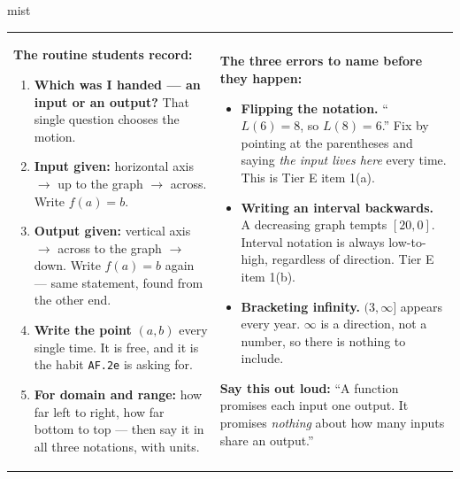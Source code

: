 \documentclass[10pt]{article}
\begin{document}
\boxguard
\begin{skillbox}{mist}
\begin{tabularx}{\linewidth}{@{}X|X@{}}
\begin{minipage}[t]{\linewidth}\vspace{0pt}
\textbf{The routine students record:}
\begin{enumerate}[leftmargin=1.4em, itemsep=2pt, topsep=2pt]
  \item \textbf{Which was I handed --- an input or an output?} That single question chooses the
        motion.
  \item \textbf{Input given:} horizontal axis $\to$ up to the graph $\to$ across. Write $f(a)=b$.
  \item \textbf{Output given:} vertical axis $\to$ across to the graph $\to$ down. Write $f(a)=b$
        again --- same statement, found from the other end.
  \item \textbf{Write the point} $(a,b)$ every single time. It is free, and it is the habit
        \texttt{AF.2e} is asking for.
  \item \textbf{For domain and range:} how far left to right, how far bottom to top --- then say
        it in all three notations, with units.
\end{enumerate}
\end{minipage}
&
\begin{minipage}[t]{\linewidth}\vspace{0pt}
\textbf{The three errors to name before they happen:}
\begin{itemize}[leftmargin=1.1em, itemsep=2pt, topsep=2pt]
  \item \textbf{Flipping the notation.} ``$L(6)=8$, so $L(8)=6$.'' Fix by pointing at the
        parentheses and saying \emph{the input lives here} every time. This is Tier E item 1(a).
  \item \textbf{Writing an interval backwards.} A decreasing graph tempts $[20,0]$. Interval
        notation is always low-to-high, regardless of direction. Tier E item 1(b).
  \item \textbf{Bracketing infinity.} $(3,\infty]$ appears every year. $\infty$ is a direction,
        not a number, so there is nothing to include.
\end{itemize}
\textbf{Say this out loud:} ``A function promises each input one output. It promises \emph{nothing}
about how many inputs share an output.''
\end{minipage}
\end{tabularx}
\end{skillbox}
\end{document}
